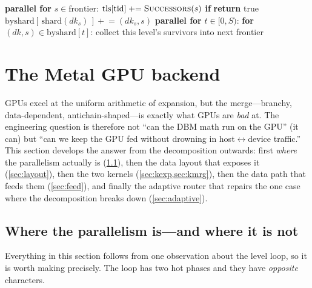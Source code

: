 \documentclass[11pt]{article}
\newcommand{\dk}{\ensuremath{\mathit{dk}}}
\begin{document}
\begin{algorithm}[t]
\caption{OpenMP level loop (one iteration)}\label{alg:omp}
\begin{algorithmic}[1]
\State \textbf{parallel for} $s \in \text{frontier}$: 
       $\text{tls}[\text{tid}] \mathrel{+}= \Call{Successors}{s}$
 
   \State \textbf{if}  \textbf{return} true
   \State $\text{byshard}[\,\text{shard}(\dk_s)\,] \mathrel{+}= (\dk_s, s)$
\EndFor
\State \textbf{parallel for} $t \in [0,S)$: 
\State \quad \textbf{for} $(\dk,s) \in \text{byshard}[t]$: \Call{AddTo}{$\text{shard}[t],\,\dk,\,s$}
\State \quad collect this level's survivors into next frontier
\end{algorithmic}
\end{algorithm}

\section{The Metal GPU backend}\label{sec:metal}
GPUs excel at the uniform arithmetic of expansion, but the merge---branchy, data-dependent,
antichain-shaped---is exactly what GPUs are \emph{bad} at. The engineering question is therefore
not ``can the DBM math run on the GPU'' (it can) but ``can we keep the GPU fed without drowning in
host$\leftrightarrow$device traffic.'' This section develops the answer from the decomposition
outwards: first \emph{where} the parallelism actually is (\cref{sec:decomp}), then the data layout
that exposes it (\cref{sec:layout}), then the two kernels (\cref{sec:kexp,sec:kmrg}), then the data
path that feeds them (\cref{sec:feed}), and finally the adaptive router that repairs the one case
where the decomposition breaks down (\cref{sec:adaptive}).

\subsection{Where the parallelism is---and where it is not}\label{sec:decomp}
Everything in this section follows from one observation about the level loop, so it is worth making
precisely. The loop has two hot phases and they have \emph{opposite} characters.
\end{document}
